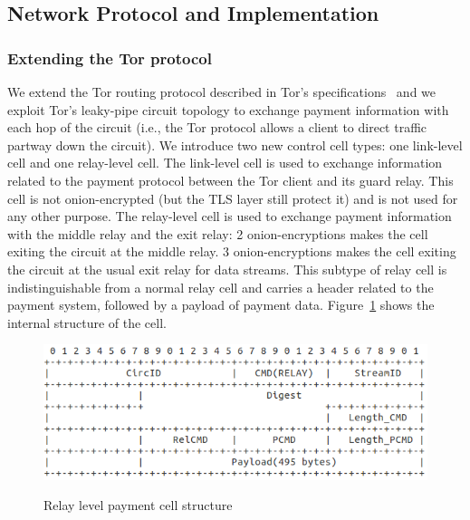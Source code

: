 \subsection{Network Protocol and Implementation}

\subsubsection{Extending the Tor protocol}
We extend the Tor routing protocol described in Tor's specifications~\cite{torspec} and we exploit Tor's leaky-pipe circuit topology to exchange payment information with each hop of the circuit (i.e., the Tor protocol allows a client to direct traffic partway down the circuit). We introduce two new control cell types: one link-level cell and one relay-level cell. The link-level cell is used to exchange information related to the payment protocol between the Tor client and its guard relay. This cell is not onion-encrypted (but the TLS layer still protect it) and is not used for any other purpose. The relay-level cell is used to exchange payment information with the middle relay and the exit relay: 2 onion-encryptions makes the cell exiting the circuit at the middle relay. 3 onion-encryptions makes the cell exiting the circuit at the usual exit relay for data streams. This subtype of relay cell is indistinguishable from a normal relay cell and carries a header related to the payment system, followed by a payload of payment data. Figure~\ref{fig:relay_command_mt_structure} shows the internal structure of the cell.

\begin{figure}[h]
	\centering
	\includegraphics[scale=0.38]{images/payment_cell_header.png}
	\label{fig:relay_command_mt_structure}
	\caption{Relay level payment cell structure}
\end{figure}

